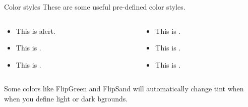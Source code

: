 \begin{frame}[c]{Color styles}
	These are some useful pre-defined color styles.

		\begin{columns}[t]
		\begin{column}[T]{5cm}
			\begin{itemize}
			\item This is \alert{alert}.
			\item This is .
			\item This is .
			\end{itemize}
		\end{column}

		\begin{column}[T]{5cm}
			\begin{itemize}
			\item This is .
			\item This is .
			\item This is .
			\end{itemize}
		\end{column}
		\end{columns}
		\vspace{1em}
		Some colors like \textcolor{FlipGreen}{FlipGreen} and \textcolor{FlipSand}{FlipSand} will automatically change tint when when you define light or dark bgrounds. 

		\vspace{1em}
\end{frame}



